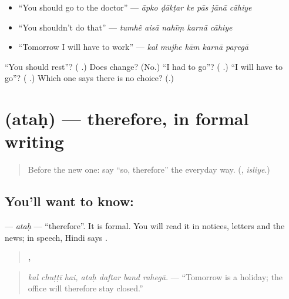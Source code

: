 \begin{itemize}
\raggedright
  \item \textquotedblleft{}You should go to the doctor\textquotedblright{} — \emph{āpko ḍākṭar ke pās jānā cāhiye}
  \item \textquotedblleft{}You shouldn't do that\textquotedblright{} — \emph{tumhẽ aisā nahīṃ karnā cāhiye}
  \item \textquotedblleft{}Tomorrow I will have to work\textquotedblright{} — \emph{kal mujhe kām karnā paṛegā}
\end{itemize}

\begin{tcolorbox}[breakable,colback=teal!4,colframe=teal!35!black,title={Before you move on}]
\textquotedblleft{}You should rest\textquotedblright{}? (\textbf{   }.) Does \textbf{} change? (No.) \textquotedblleft{}I had to go\textquotedblright{}? (\textbf{  }.) \textquotedblleft{}I will have to go\textquotedblright{}? (\textbf{  }.) Which one says there is no choice? (\textbf{}.)
\end{tcolorbox}
\section[\texorpdfstring{\hi{अतः} (ataḥ)}{अतः (ataḥ)}]{ (ataḥ) — therefore, in formal writing}

\label{lesson:HI-C281-atah}



\begin{quote}
Before the new one: say \textquotedblleft{}so, therefore\textquotedblright{} the everyday way. (\textbf{}, \emph{isliye}.)
\end{quote}

\subsection*{You'll want to know: }
\textbf{} — \emph{ataḥ} — \textquotedblleft{}therefore\textquotedblright{}. It is formal. You will read it in notices, letters and the news; in speech, Hindi says \textbf{}.

\begin{quote}
\textbf{  ,    }
\end{quote}

\begin{quote}
\emph{kal chuṭṭī hai, ataḥ daftar band rahegā.} — \textquotedblleft{}Tomorrow is a holiday; the office will therefore stay closed.\textquotedblright{}
\end{quote}

